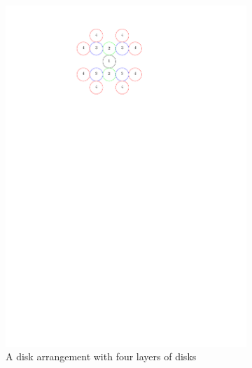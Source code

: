 \begin{figure}[H]
\begin{center}
\begin{subfigure}[b]{0.24\textwidth}
	  \includegraphics[width=\textwidth]{graphics/degree4arrangement.pdf}
	  \caption{A disk arrangement with four layers of disks}
	  \label{fig:circlePacking1-3}
  \end{subfigure}
  \begin{subfigure}[b]{0.24\textwidth}

\end{subfigure}
\end{center}
\end{figure}
